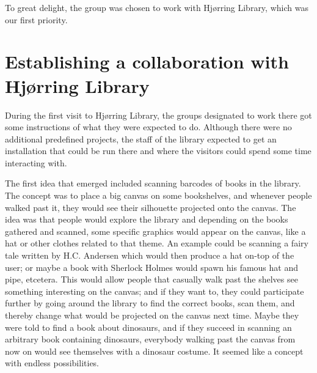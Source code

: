 To great delight, the group was chosen to work with Hj{\o}rring Library, which was our first priority.

\section{Establishing a collaboration with Hj{\o}rring Library}


During the first visit to Hj{\o}rring Library, the groups designated to work there got some instructions of what they were expected to do. Although there were no additional predefined projects, the staff of the library expected to get an installation that could be run there and where the visitors could spend some time interacting with.

The first idea that emerged included scanning barcodes of books in the library. The concept was to place a big canvas on some bookshelves, and whenever people walked past it, they would see their silhouette projected onto the canvas. The idea was that people would explore the library and depending on the books gathered and scanned, some specific graphics would appear on the canvas, like a hat or other clothes related to that theme. An example could be scanning a fairy tale written by H.C. Andersen which would then produce a hat on-top of the user; or maybe a book with Sherlock Holmes would spawn his famous hat and pipe, etcetera. This would allow people that casually walk past the shelves see something interesting on the canvas; and if they want to, they could participate further by going around the library to find the correct books, scan them, and thereby change what would be projected on the canvas next time. Maybe they were told to find a book about dinosaurs, and if they succeed in scanning an arbitrary book containing dinosaurs, everybody walking past the canvas from now on would see themselves with a dinosaur costume. It seemed like a concept with endless possibilities.

